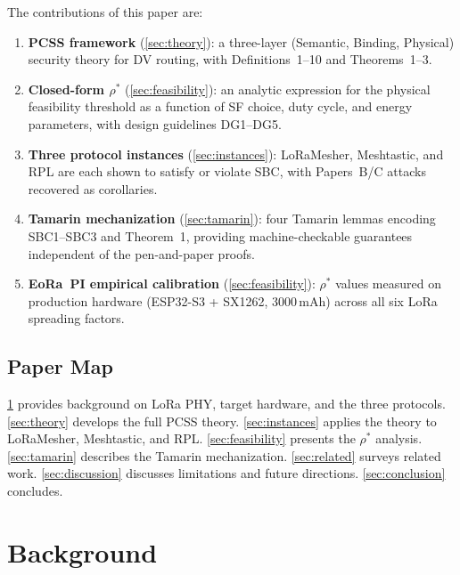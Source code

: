 \documentclass[journal,compsoc]{IEEEtran}
\theoremstyle{plain}
\theoremstyle{definition}
\theoremstyle{remark}
\newcommand{\rhostar}{\rho^*}
\begin{document}
The contributions of this paper are:
\begin{enumerate}[label=\textbf{C\arabic*.}, leftmargin=*, itemsep=2pt]
  \item \textbf{PCSS framework} (\cref{sec:theory}): a three-layer
        (Semantic, Binding, Physical) security theory for DV routing,
        with Definitions~1--10 and Theorems~1--3.
  \item \textbf{Closed-form $\rhostar$} (\cref{sec:feasibility}): an
        analytic expression for the physical feasibility threshold as a
        function of SF choice, duty cycle, and energy parameters, with
        design guidelines DG1--DG5.
  \item \textbf{Three protocol instances} (\cref{sec:instances}):
        LoRaMesher, Meshtastic, and RPL are each shown to satisfy or
        violate SBC, with Papers~B/C attacks recovered as corollaries.
  \item \textbf{Tamarin mechanization} (\cref{sec:tamarin}):
        four Tamarin lemmas encoding SBC1--SBC3 and Theorem~1, providing
        machine-checkable guarantees independent of the pen-and-paper proofs.
  \item \textbf{EoRa~PI empirical calibration} (\cref{sec:feasibility}):
        $\rhostar$ values measured on production hardware (ESP32-S3 +
        SX1262, 3000\,mAh) across all six LoRa spreading factors.
\end{enumerate}

\subsection{Paper Map}

\cref{sec:background} provides background on LoRa PHY, target hardware, and
the three protocols.  \cref{sec:theory} develops the full PCSS theory.
\cref{sec:instances} applies the theory to LoRaMesher, Meshtastic, and RPL.
\cref{sec:feasibility} presents the $\rhostar$ analysis.  \cref{sec:tamarin}
describes the Tamarin mechanization.  \cref{sec:related} surveys related
work.  \cref{sec:discussion} discusses limitations and future directions.
\cref{sec:conclusion} concludes.

\section{Background}
\label{sec:background}
\end{document}
